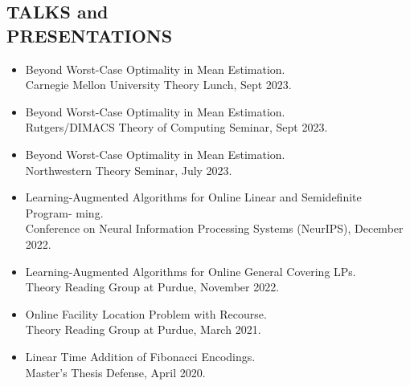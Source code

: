 \documentclass[margin, 10pt]{res} %
\begin{document}
\begin{resume}
\section{TALKS and \\ PRESENTATIONS}
\begin{itemize}
\item Beyond Worst-Case Optimality in Mean Estimation.\\
Carnegie Mellon University Theory Lunch, Sept 2023.
\item Beyond Worst-Case Optimality in Mean Estimation.\\
Rutgers/DIMACS Theory of Computing Seminar, Sept 2023.
\item Beyond Worst-Case Optimality in Mean Estimation.\\
Northwestern Theory Seminar, July 2023.
\item Learning-Augmented Algorithms for Online Linear and Semidefinite Program-
ming.\\
Conference on Neural Information Processing Systems (NeurIPS), December 2022.
\item Learning-Augmented Algorithms for Online General Covering LPs.\\
Theory Reading Group at Purdue, November 2022.
\item Online Facility Location Problem with Recourse.\\
Theory Reading Group at Purdue, March 2021.
\item Linear Time Addition of Fibonacci Encodings.\\
Master's Thesis Defense, April 2020.
\end{itemize}


\end{resume}
\end{document}
